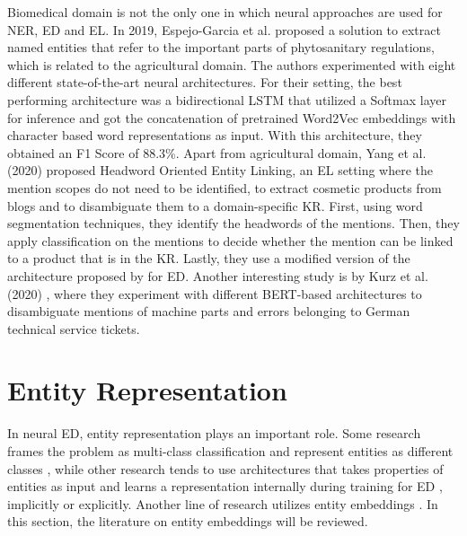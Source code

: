 \documentclass{report}
\theoremstyle{definition}
\theoremstyle{remark}
\begin{document}
Biomedical domain is not the only one in which neural approaches are used for NER, ED and EL. In 2019, Espejo-Garcia et al. \cite{agricultural} proposed a solution to extract named entities that refer to the important parts of phytosanitary regulations, which is related to the agricultural domain. The authors experimented with eight different state-of-the-art neural architectures. For their setting, the best performing architecture was a bidirectional LSTM \cite{bilstm} that utilized a Softmax layer for inference and got the concatenation of pretrained Word2Vec \cite{w2v} embeddings with character based word representations as input. With this architecture, they obtained an F1 Score of 88.3\%. Apart from agricultural domain, Yang et al. (2020) \cite{cosmetic} proposed Headword Oriented Entity Linking, an EL setting where the mention scopes do not need to be identified, to extract cosmetic products from blogs and to disambiguate them to a domain-specific KR. First, using word segmentation techniques, they identify the headwords of the mentions. Then, they apply classification on the mentions to decide whether the mention can be linked to a product that is in the KR. Lastly, they use a modified version of the architecture proposed by \cite{gupta} for ED.  Another interesting study is by Kurz et al. (2020) \cite{TechTickets}, where they experiment with different BERT-based architectures to disambiguate mentions of machine parts and errors belonging to German technical service tickets.

\section{Entity Representation}
\label{entityRep}

In neural ED, entity representation plays an important role. Some research frames the problem as multi-class classification and represent entities as different classes \cite{bertEL,MedDiffArc,MedFeedback}, while other research tends to use architectures that takes properties of entities as input and learns a representation internally during training for ED \cite{scalablezeroshot}, implicitly or explicitly. Another line of research utilizes entity embeddings \cite{REL,kolitsas,dca,MedicalTriplet}. In this section, the literature on entity embeddings will be reviewed.
\end{document}
